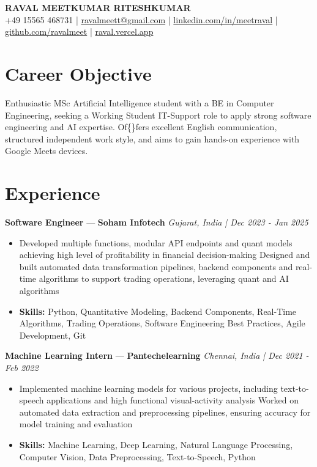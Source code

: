 \documentclass[a4paper,10pt]{article}
\begin{document}
\begin{center}
  {\Large\bfseries RAVAL MEETKUMAR RITESHKUMAR}\\[2pt]
  {\small +49 15565 468731 \;|\; \href{mailto:ravalmeett@gmail.com}{ravalmeett@gmail.com} \;|\; \href{https://www.linkedin.com/in/meetraval/}{linkedin.com/in/meetraval} \;|\; \href{https://github.com/ravalmeet}{github.com/ravalmeet} \;|\; \href{https://raval.vercel.app/}{raval.vercel.app}}
\end{center}
\vspace{-3pt}

\section*{Career Objective}
Enthusiastic MSc Artificial Intelligence student with a BE in Computer Engineering, seeking a Working Student IT-Support role to apply strong software engineering and AI expertise. Of\{\}fers excellent English communication, structured independent work style, and aims to gain hands-on experience with Google Meets devices.\par

\section*{Experience}
\textbf{Software Engineer} — \textbf{Soham Infotech} \hfill \textit{Gujarat, India \;|\; Dec 2023 - Jan 2025}\par
\vspace{1pt}
\begin{itemize}
  \item Developed multiple functions, modular API endpoints and quant models achieving high level of profitability in financial decision-making Designed and built automated data transformation pipelines, backend components and real-time algorithms to support trading operations, leveraging quant and AI algorithms
  \item \textbf{Skills:} Python, Quantitative Modeling, Backend Components, Real-Time Algorithms, Trading Operations, Software Engineering Best Practices, Agile Development, Git
\end{itemize}
\vspace{3pt}
\textbf{Machine Learning Intern} — \textbf{Pantechelearning} \hfill \textit{Chennai, India \;|\; Dec 2021 - Feb 2022}\par
\vspace{1pt}
\begin{itemize}
  \item Implemented machine learning models for various projects, including text-to-speech applications and high functional visual-activity analysis Worked on automated data extraction and preprocessing pipelines, ensuring accuracy for model training and evaluation
  \item \textbf{Skills:} Machine Learning, Deep Learning, Natural Language Processing, Computer Vision, Data Preprocessing, Text-to-Speech, Python
\end{itemize}
\end{document}
